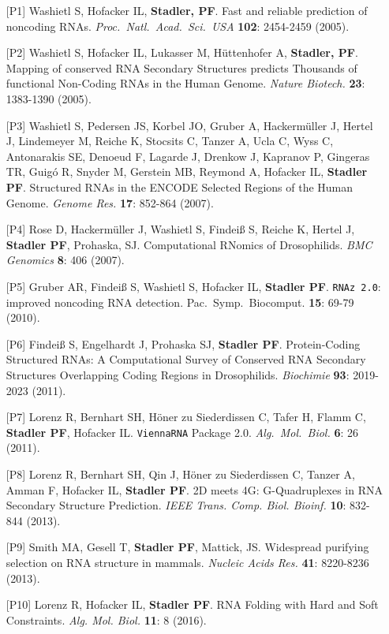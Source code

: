 \documentclass{article}
\begin{document}
\begin{itemize}
\item[{[P1]}] Washietl S, Hofacker IL, \textbf{Stadler, PF}. 
  Fast and reliable prediction of noncoding RNAs.
  \textit{Proc.\ Natl.\ Acad.\ Sci.\ USA} \textbf{102}: 2454-2459 (2005).
\item[{[P2]}] Washietl S, Hofacker IL, Lukasser M, H{\"u}ttenhofer A, 
  \textbf{Stadler, PF}. Mapping of conserved {RNA} Secondary Structures 
  predicts Thousands of functional Non-Coding RNAs in the Human Genome.
  \textit{Nature Biotech.} \textbf{23}: 1383-1390 (2005).
\item[{[P3]}] Washietl S, Pedersen JS, Korbel JO, Gruber A, Hackerm{\"u}ller 
  J, Hertel J, Lindemeyer M, Reiche K, Stocsits C, Tanzer A, Ucla C,
  Wyss C, Antonarakis SE, Denoeud F, Lagarde J, Drenkow J, Kapranov P,
  Gingeras TR, Guig{\'o} R, Snyder M, Gerstein MB, Reymond A, Hofacker IL,
  \textbf{Stadler PF}. Structured RNAs in the ENCODE Selected Regions
  of the Human Genome. \textit{Genome Res.} \textbf{17}: 852-864 (2007).
\item[{[P4]}] Rose D,  Hackerm\"{u}ller J, Washietl S, Findei{\ss} S, 
  Reiche K, Hertel J, \textbf{Stadler PF}, Prohaska, SJ.
  Computational {RNomics} of Drosophilids. \textit{BMC Genomics} \textbf{8}:
  406 (2007).
\item[{[P5]}] Gruber AR, Findei{\ss} S, Washietl S, Hofacker IL, 
  \textbf{Stadler PF}. \texttt{RNAz 2.0}: improved noncoding RNA detection.
  Pac.\ Symp.\ Biocomput. \textbf{15}: 69-79 (2010).
\item[{[P6]}] Findei{\ss} S, Engelhardt J, Prohaska SJ, \textbf{Stadler PF}.
  Protein-Coding Structured RNAs: A Computational Survey of Conserved RNA 
  Secondary Structures Overlapping Coding Regions in Drosophilids.
  \textit{Biochimie} \textbf{93}: 2019-2023 (2011).
\item[{[P7]}] Lorenz R, Bernhart SH, H{\"o}ner zu Siederdissen C, Tafer H,
  Flamm C, \textbf{Stadler PF}, Hofacker IL.  \texttt{ViennaRNA} Package
  2.0. \textit{Alg.\ Mol.\ Biol.} \textbf{6}: 26 (2011).
\item[{[P8]}] Lorenz R, Bernhart SH, Qin J, H{\"o}ner zu Siederdissen C, 
  Tanzer A, Amman F, Hofacker IL, \textbf{Stadler PF}. 
  2D meets 4G: G-Quadruplexes in RNA Secondary Structure Prediction.
  \textit{IEEE Trans. Comp. Biol. Bioinf.} \textbf{10}: 832-844 (2013).
\item[{[P9]}] Smith MA, Gesell T, \textbf{Stadler PF}, Mattick, JS.
  Widespread purifying selection on RNA structure in mammals.
  \textit{Nucleic Acids Res.} \textbf{41}: 8220-8236 (2013).
\item[{[P10]}] Lorenz R, Hofacker IL, \textbf{Stadler PF}. RNA Folding with
  Hard and Soft Constraints. \textit{Alg. Mol. Biol.} \textbf{11}: 8 (2016).
\end{itemize}
\end{document}
